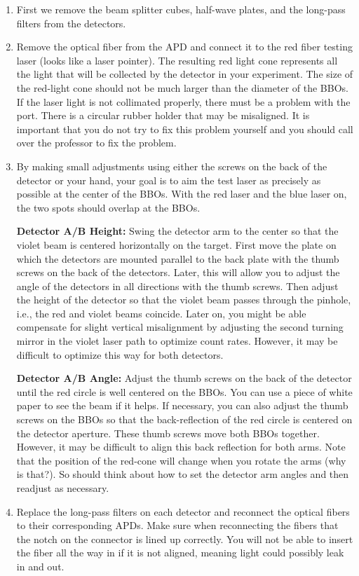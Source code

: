 \documentclass{../lab}
\begin{document}
\begin{enumerate}
    \item First we remove the beam splitter cubes, half-wave plates, and the long-pass filters from the detectors.

    \item Remove the optical fiber from the APD and connect it to the red fiber testing laser (looks like a laser pointer). The resulting red light cone represents all the light that will be collected by the detector in your experiment. The size of the red-light cone should not be much larger than the diameter of the BBOs. If the laser light is not collimated properly, there must be a problem with the port. There is a circular rubber holder that may be misaligned. It is important that you do not try to fix this problem yourself and you should call over the professor to fix the problem.

    \item By making small adjustments using either the screws on the back of the detector or your hand, your goal is to aim the test laser as precisely  as possible at the center of the BBOs. With the red laser and the blue laser on, the two spots should overlap at the BBOs.
    
    \textbf{Detector A/B Height:} Swing the detector arm to the center so that the violet beam is centered horizontally on the target. First move the plate on which the detectors are mounted parallel to the back plate with the thumb screws on the back of the detectors. Later, this will allow you to adjust the angle of the detectors in all directions with the thumb screws. Then adjust the height of the detector so that the violet beam passes through the pinhole, i.e., the red and violet beams coincide. Later on, you might be able compensate for slight vertical misalignment by adjusting the second turning mirror in the violet laser path to optimize count rates. However, it may be difficult to optimize this way for both detectors.
    
    \textbf{Detector A/B Angle:} Adjust the thumb screws on the back of the detector until the red circle is well centered on the BBOs. You can use a piece of white paper to see the beam if it helps. If necessary, you can also adjust the thumb screws on the BBOs so that the back-reflection of the red circle is centered on the detector aperture. These thumb screws move both BBOs together. However, it may be difficult to align this back reflection for both arms. Note that the position of the red-cone will change when you rotate the arms (why is that?). So should think about how to set the detector arm angles and then readjust as necessary.

    \item Replace the long-pass filters on each detector and reconnect the optical fibers to their corresponding APDs. Make sure when reconnecting the fibers that the notch on the connector is lined up correctly. You will not be able to insert the fiber all the way in if it is not aligned, meaning light could possibly leak in and out.

\end{enumerate}
\end{document}
